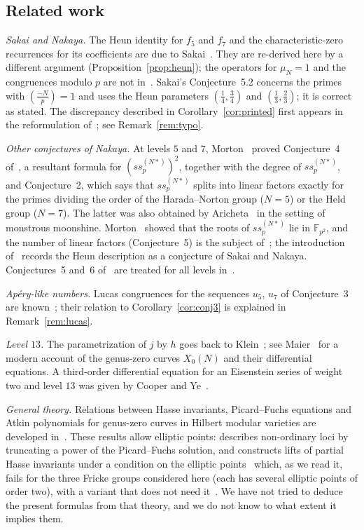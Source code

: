 \documentclass[11pt,a4paper]{article}
\theoremstyle{definition}
\theoremstyle{remark}
\newcommand{\F}{\mathbb{F}}
\newcommand{\leg}[2]{\left(\frac{#1}{#2}\right)}
\newcommand{\ssp}{\mathit{ss}_p}
\numberwithin{equation}{section}
\begin{document}
\subsection*{Related work}
\emph{Sakai and Nakaya.} The Heun identity for $f_5$ and $f_7$ and the
characteristic-zero recurrences for its coefficients are due to
Sakai~\cite[Proposition~3.1 and Lemma~3.3]{Sakai14}. They are re-derived here
by a different argument (Proposition~\ref{prop:heun}); the operators for
$\mu_N=1$ and the congruences modulo $p$ are not in~\cite{Sakai14}. Sakai's
Conjecture~5.2 concerns the primes with $\leg{-N}{p}=1$ and uses the Heun
parameters $(\frac14,\frac34)$ and $(\frac13,\frac23)$; it is correct as
stated. The discrepancy described in Corollary~\ref{cor:printed} first appears
in the reformulation of~\cite[Conjecture~1]{Nakaya19}; see
Remark~\ref{rem:typo}.

\emph{Other conjectures of Nakaya.} At levels $5$ and $7$,
Morton~\cite{Morton23} proved Conjecture~4 of~\cite{Nakaya19}, a resultant
formula for $(\ssp^{(N*)})^2$, together with the degree of $\ssp^{(N*)}$, and
Conjecture~2, which says that $\ssp^{(N*)}$ splits into linear factors exactly
for the primes dividing the order of the Harada--Norton group ($N=5$) or the
Held group ($N=7$). The latter was also obtained by Aricheta~\cite{Aricheta}
in the setting of monstrous moonshine. Morton~\cite{Morton21a} showed that the
roots of $\ssp^{(N*)}$ lie in $\F_{p^2}$, and the number of linear factors
(Conjecture~5) is the subject of~\cite{Morton21a,Morton21b,Morton24}; the
introduction of~\cite{Morton24} records the Heun description as a conjecture
of Sakai and Nakaya. Conjectures~5 and~6 of~\cite{Nakaya19} are treated for all
levels in~\cite{JordanNakaya}.

\emph{Ap\'ery-like numbers.} Lucas congruences for the sequences $u_5$, $u_7$
of Conjecture~3 are known~\cite{MalikStraub,BTY}; their relation to
Corollary~\ref{cor:conj3} is explained in Remark~\ref{rem:lucas}.

\emph{Level $13$.} The parametrization of $j$ by $h$ goes back to
Klein~\cite{Klein}; see Maier~\cite{Maier} for a modern account of the
genus-zero curves $X_0(N)$ and their differential equations. A third-order
differential equation for an Eisenstein series of weight two and level $13$
was given by Cooper and Ye~\cite{CooperYe}.

\emph{General theory.} Relations between Hasse invariants, Picard--Fuchs
equations and Atkin polynomials for genus-zero curves in Hilbert modular
varieties are developed in~\cite{Bogo,BL1,BL2}. These results allow elliptic
points: \cite[Corollary~3]{Bogo} describes non-ordinary loci by truncating a
power of the Picard--Fuchs solution, and \cite{BL1} constructs lifts of
partial Hasse invariants under a condition on the elliptic
points~\cite[(20)]{BL1} which, as we read it, fails for the three Fricke
groups considered here (each has several elliptic points of order two), with
a variant that does not need it~\cite[Remark~5]{BL1}. We have
not tried to deduce the present formulas from that theory, and we do not know
to what extent it implies them.
\end{document}
